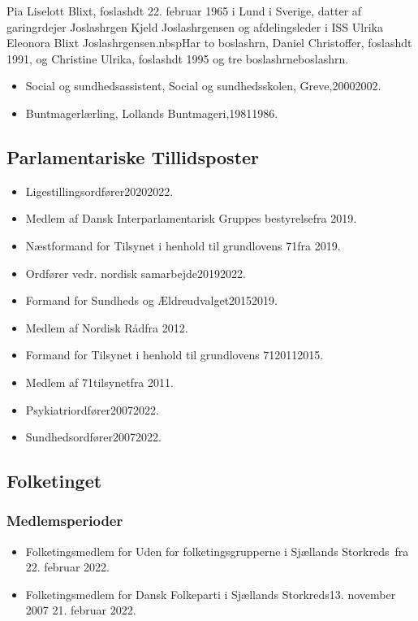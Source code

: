\documentclass[11pt, a4paper]{awesome-cv}
\begin{document}
\makecvheader[R]
\makelettertitle
\begin{cvletter}
Pia Liselott Blixt, foslashdt 22. februar 1965 i Lund i Sverige, datter af garingrdejer Joslashrgen Kjeld Joslashrgensen og afdelingsleder i ISS Ulrika Eleonora Blixt Joslashrgensen.nbspHar to boslashrn, Daniel Christoffer, foslashdt 1991, og Christine Ulrika, foslashdt 1995 og tre boslashrneboslashrn.

\begin{itemize}
\item Social og sundhedsassistent, Social og sundhedsskolen, Greve,20002002.
\item Buntmagerlærling, Lollands Buntmageri,19811986.
\end{itemize}
\subsection*{Parlamentariske Tillidsposter}
\begin{itemize}
\item Ligestillingsordfører20202022.
\item Medlem af Dansk Interparlamentarisk Gruppes bestyrelsefra 2019.
\item Næstformand for Tilsynet i henhold til grundlovens  71fra 2019.
\item Ordfører vedr. nordisk samarbejde20192022.
\item Formand for Sundheds og Ældreudvalget20152019.
\item Medlem af Nordisk Rådfra 2012.
\item Formand for Tilsynet i henhold til grundlovens  7120112015.
\item Medlem af 71tilsynetfra 2011.
\item Psykiatriordfører20072022.
\item Sundhedsordfører20072022.
\end{itemize}
\subsection*{Folketinget}
\subsubsection*{Medlemsperioder}
\begin{itemize}
\item Folketingsmedlem for Uden for folketingsgrupperne i Sjællands Storkreds fra 22. februar 2022.
\item Folketingsmedlem for Dansk Folkeparti i Sjællands Storkreds13. november 2007  21. februar 2022.
\end{itemize}

\end{cvletter}
\end{document}
